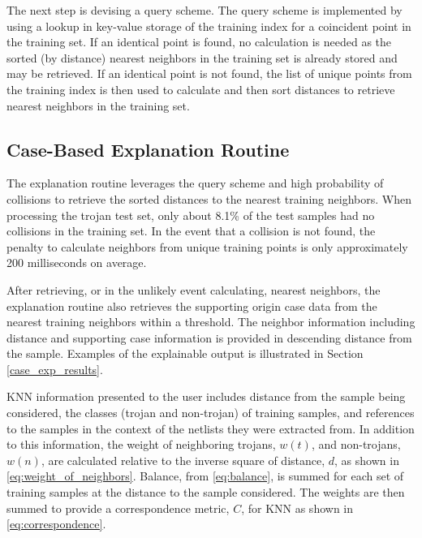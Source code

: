 The next step is devising a query scheme.  The query scheme is implemented by
using a lookup in key-value storage of the training index for a coincident point
in the training set.  If an identical point is found, no calculation is needed
as the sorted (by distance) nearest neighbors in the training set is already
stored and may be retrieved. If an identical point is not found, the list of
unique points from the training index is then used to calculate and then sort
distances to retrieve nearest neighbors in the training set.

\subsection{Case-Based Explanation Routine}

The explanation routine leverages the query scheme and high probability of
collisions to retrieve the sorted distances to the nearest training neighbors.
When processing the trojan test set, only about 8.1\% of the test samples had no
collisions in the training set.  In the event that a collision is not found, the
penalty to calculate neighbors from unique training points is only approximately
200 milliseconds on average.

After retrieving, or in the unlikely event calculating, nearest neighbors, the
explanation routine also retrieves the supporting origin case data from the nearest
training neighbors within a threshold.  The neighbor information including distance
and supporting case information is provided in descending distance from the sample.
Examples of the explainable output is illustrated in Section \ref{case_exp_results}. 


KNN information presented to the user includes distance from the sample being
considered, the classes (trojan and non-trojan) of training samples, and
references to the samples in the context of the netlists they were extracted
from.  In addition to this information, the weight of neighboring trojans,
$w(t)$, and non-trojans, $w(n)$, are calculated relative to the inverse square
of distance, $d$, as shown in \ref{eq:weight_of_neighbors}.  Balance, from
\ref{eq:balance}, is summed for each set of training samples at the distance to
the sample considered.  The weights are then summed to provide a correspondence
metric, $C$, for KNN as shown in \ref{eq:correspondence}.
